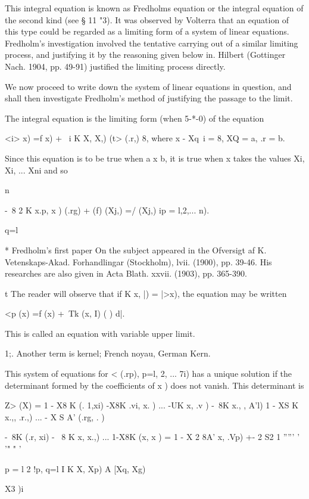 This integral equation is known as Fredholms equation or the integral
equation of the second kind (see § 11 "3). It was observed by Volterra
that an equation of this type could be regarded as a limiting form of
a system of linear equations. Fredholm's investigation involved the
tentative carrying out of a similar limiting process, and justifying
it by the reasoning given below in. Hilbert (Gottinger Nach.
1904, pp. 49-91) justified the limiting process directly.

We now proceed to write down the system of linear equations in
question, and shall then investigate Fredholm's method of justifying
the passage to the limit.

The integral equation is the limiting form (when 5-*-0) of the
equation

<i> x) =f x) + \ i K X, X,) (t> (.r,) 8, where x - Xq\ i = 8, XQ = a,
.r = b.

Since this equation is to be true when a x b, it is true when x takes
the values Xi, Xi, ... Xni and so

n

-\ 8 2 K x.p, x ) (.rg) + (f) (Xj,) =/ (Xj,) ip = l,2,... n).

q=l

* Fredholm's first paper On the subject appeared in the Ofversigt af
K. Vetenskaps-Akad. Forhandlingar (Stockholm), lvii. (1900), pp.
39-46. His researches are also given in Acta Blath. xxvii. (1903), pp.
365-390.

t The reader will observe that if K x, |) = |>x), the equation may be
written

<p (x) =f (x) +\ Tk (x, I) ( ) d|.

This is called an equation with variable upper limit.

1;. Another term is kernel; French noyau, German Kern.

%
%

This system of equations for < (.rp), p=l, 2, ... 7i) has a unique
solution if the determinant formed by the coefficients of x ) does not
vanish. This determinant is

Z> (X) = 1 - X8 K (. 1,xi) -X8K .vi, x. ) ... -UK x, .v ) -\ 8K x.,
, A'l) 1 - XS K x.,, .r.,) ... - X S A' (.rg, . )

-\ 8K (.r, xi) - \ 8 K x, x.,) ... 1-X8K (x, x ) = 1 - X 2 8A' x,
.Vp) +- 2 S2 1 ''''' '  '" " '

p = l 2 !p, q=l I K X, Xp) A [Xq, Xg)

X3 )i

